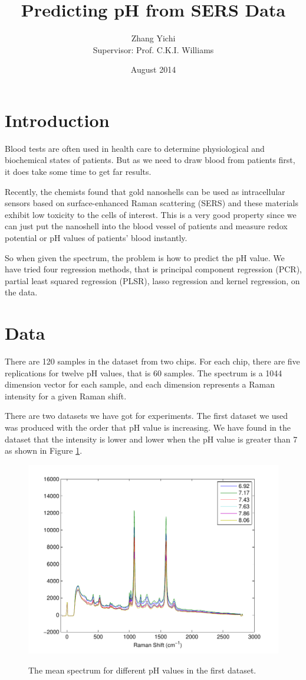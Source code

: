 \documentclass[a4paper]{article}
\begin{document}
\title{\textbf{Predicting pH from SERS Data}}
\author{Zhang Yichi\\ Supervisor: Prof. C.K.I. Williams}
\date{August 2014}
\maketitle

\section{Introduction}
Blood tests are often used in health care to determine physiological and biochemical states of patients. But as we need to draw blood from patients first, it does take some time to get far results. 

Recently, the chemists found that gold nanoshells can be used as intracellular sensors based on surface-enhanced Raman scattering (SERS) and these materials exhibit low toxicity to the cells of interest. This is a very good property since we can just put the nanoshell into the blood vessel of patients and measure redox potential or pH values of patients' blood instantly.

So when given the spectrum, the problem is how to predict the pH value. We have tried four regression methods, that is principal component regression (PCR), partial least squared regression (PLSR), lasso regression and kernel regression, on the data.

\section{Data}
There are 120 samples in the dataset from two chips. For each chip, there are five replications for twelve pH values, that is 60 samples. The spectrum is a 1044 dimension vector for each sample, and each dimension represents a Raman intensity for a given Raman shift.

There are two datasets we have got for experiments. The first dataset we used was produced with the order that pH value is increasing. We have found in the dataset that the intensity is lower and lower when the pH value is greater than 7 as shown in Figure \ref{pic1}.

\begin{figure}[h]
  \centering
  \includegraphics[width=.6\textwidth]{images/compare.pdf}\\
  \caption{The mean spectrum for different pH values in the first dataset.}\label{pic1}
\end{figure}
\end{document}
